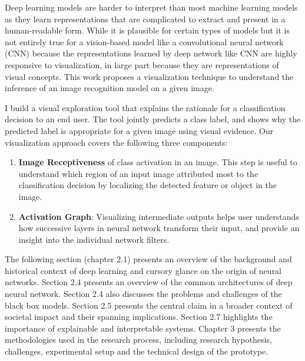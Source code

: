 Deep learning models are harder to interpret than most machine learning models as they learn representations that are complicated to extract and present in a human-readable form.  While it is plausible for certain types of models but it is  not entirely true for a vision-based model like a convolutional neural network (CNN) because the representations learned by deep network like CNN are highly responsive to visualization, in large part because they are representations of visual concepts. This work proposes a visualization technique to understand the inference of an image recognition model on a given image. 

I build a visual exploration tool that explains the rationale for a classification decision to an end user. The tool jointly predicts a class label,  and shows why the predicted label is appropriate for a given image using visual evidence. Our visualization approach covers the following three components:

\begin{enumerate}
\item \textbf{Image Receptiveness} of class activation in an image. This step is useful to understand which region of an input image attributed most to the classification decision by localizing the detected feature or object in the image.


\item  \textbf{Activation Graph}: Visualizing intermediate outputs helps user understands how successive layers in neural network transform their input, and provide an insight into the individual network filters.

\end{enumerate}

The following section (chapter 2.1) presents an overview of the background and historical context of deep learning and cursory glance on the origin of neural networks.  Section 2.4 presents an overview of the common architectures of deep neural network.  Section 2.4 also discusses the problems and challenges of the black box models. Section 2.5 presents the central claim in a broader context of societal impact and their spanning implications. Section 2.7 highlights the importance of explainable and interpretable systems.  Chapter 3 presents the methodologies used in the research process, including research hypothesis, challenges, experimental setup and the technical design of the prototype.

